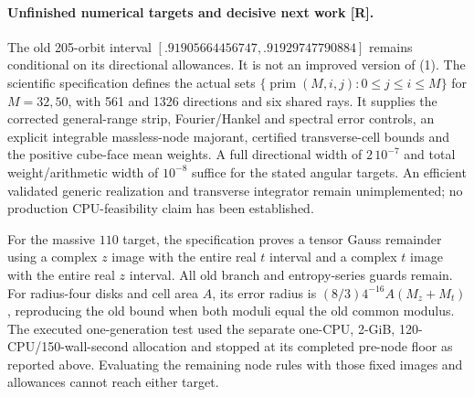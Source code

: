 \documentclass[10pt]{article}
\begin{document}
\paragraph{Unfinished numerical targets and decisive next work [R].}
The old 205-orbit interval
$[.91905664456747,.91929747790884]$ remains conditional on its
directional allowances. It is not an improved version of (1).
The scientific specification
defines the actual sets
$\{\operatorname{prim}(M,i,j):0\leq j\leq i\leq M\}$ for
$M=32,50$, with 561 and 1326 directions and six shared rays.
It supplies the corrected general-range strip, Fourier/Hankel and
spectral error controls, an explicit integrable massless-node
majorant, certified transverse-cell bounds and the positive
cube-face mean weights. A full directional width of $2\,10^{-7}$
and total weight/arithmetic width of $10^{-8}$ suffice for the
stated angular targets. An efficient validated generic realization
and transverse integrator remain unimplemented; no production
CPU-feasibility claim has been established.

For the massive $110$ target, the specification proves
a tensor Gauss remainder using a complex $z$ image with the entire
real $t$ interval and a complex $t$ image with the entire real $z$
interval. All old branch and entropy-series guards remain.
For radius-four disks and cell area $A$, its error radius is
$(8/3)4^{-16}A(M_z+M_t)$, reproducing the old bound when both
moduli equal the old common modulus. The executed one-generation
test used the separate one-CPU, 2-GiB, 120-CPU/150-wall-second
allocation and stopped at its completed pre-node floor as
reported above. Evaluating the remaining node rules with those
fixed images and allowances cannot reach either target.
\end{document}
